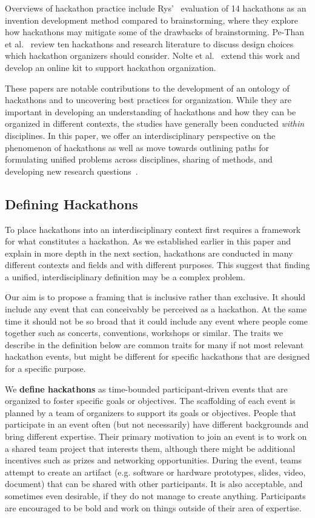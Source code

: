 \documentclass{ieeeaccess}
\begin{document}
Overviews of hackathon practice include Rys'~\cite{rys2021invention} evaluation of 14 hackathons as an invention development method compared to brainstorming, where they explore how hackathons may mitigate some of the drawbacks of brainstorming. 
Pe-Than et al.~\cite{pe2019designing} review ten hackathons and research literature to discuss design choices which hackathon organizers should consider. 
Nolte et al.~\cite{nolte2020organize} extend this work and develop an online kit to support hackathon organization.

These papers are notable contributions to the development of an ontology of hackathons and to uncovering best practices for organization.
While they are important in developing an understanding of hackathons and how they can be organized in different contexts, the studies have generally been conducted \textit{within} disciplines. 
In this paper, we offer an interdisciplinary perspective on the phenomenon of hackathons as well as move towards outlining paths for formulating unified problems across disciplines, sharing of methods, and developing new research questions~\cite{miller2008epistemological,eigenbrode2007employing}.

\subsection{Defining Hackathons}
To place hackathons into an interdisciplinary context first requires a framework for what constitutes a hackathon.
As we established earlier in this paper and explain in more depth in the next section, hackathons are conducted in many different contexts and fields and with different purposes.
This suggest that finding a unified, interdisciplinary definition may be a complex problem.

Our aim is to propose a framing that is inclusive rather than exclusive. 
It should include any event that can conceivably be perceived as a hackathon. 
At the same time it should not be so broad that it could include any event where people come together such as concerts, conventions, workshops or similar. 
The traits we describe in the definition below are common traits for many if not most relevant hackathon events, but might be different for specific hackathons that are designed for a specific purpose.

We \textbf{define hackathons} as time-bounded participant-driven events that are organized to foster specific goals or objectives. 
The scaffolding of each event is planned by a team of organizers to support its goals or objectives. 
People that participate in an event often (but not necessarily) have different backgrounds and bring different expertise. 
Their primary motivation to join an event is to work on a shared team project that interests them, although there might be additional incentives such as prizes and networking opportunities. 
During the event, teams attempt to create an artifact (e.g. software or hardware prototypes, slides, video, document) that can be shared with other participants. 
It is also acceptable, and sometimes even desirable, if they do not manage to create anything. 
Participants are encouraged to be bold and work on things outside of their area of expertise.
\end{document}
